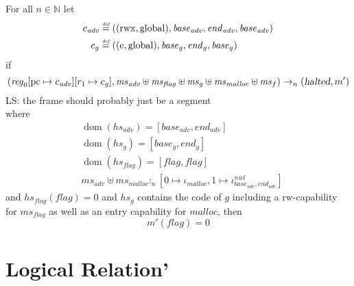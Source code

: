 \documentclass[a4paper]{article}
\newcommand{\forcenewline}{$\phantom{v}$\\}
\newcommand{\update}[2]{[#1 \mapsto #2]}
\newcommand{\defeq}{\stackrel{\textit{\tiny{def}}}{=}}
\DeclareMathOperator{\dom}{dom}
\newcommand\lau[1]{{\color{purple} \sf \footnotesize {LS: #1}}\\}
\newcommand{\var}[1]{\mathit{#1}}
\newcommand{\hs}{\var{ms}}
\newcommand{\ms}{\hs}
\newcommand{\pcreg}{\mathrm{pc}}
\newcommand{\start}{\var{base}}
\newcommand{\addrend}{\var{end}}
\newcommand{\reg}{\var{reg}}
\newcommand{\heap}{\var{mem}}
\newcommand{\adv}{\var{adv}}
\newcommand{\flag}{\var{flag}}
\newcommand{\halted}{\textsl{halted}}
\newcommand{\heapSat}[3][\heap]{#1 :_{#2} #3}
\newcommand{\codelabel}[1]{\mathit{#1}}
\newcommand{\malloc}{\codelabel{malloc}}
\newcommand{\nats}{\mathbb{N}}
\newcommand{\plainperm}[1]{\mathrm{#1}}
\newcommand{\readwrite}{\plainperm{rw}}
\newcommand{\entry}{\plainperm{e}}
\newcommand{\rwx}{\plainperm{rwx}}
\newcommand{\glob}{\plainperm{global}}
\newcommand{\step}[1][]{\rightarrow_{#1}}
\begin{document}
\begin{lemma}\forcenewline
  For all $n \in \nats$
  let
  \begin{align*}
    c_{\var{adv}} & \defeq ((\rwx,\glob),\start_{\adv},\addrend_{\adv},\start_{\adv}) \\
    c_{g} & \defeq ((\entry,\glob),\start_g,\addrend_g,\start_g)
  \end{align*}
  if
  \[
    (\reg_0\update{\pcreg}{c_{\adv}}
    \update{r_1}{c_g},\hs_{\adv} \uplus \hs_{\flag} \uplus \hs_{g} \uplus \hs_{\malloc} \uplus \ms_f) \step[n] (\halted,m')
  \]
  \lau{the frame should probably just be a segment}
  where 
  \begin{align*}
    &\dom(hs_{\adv}) = [\start_\adv,\addrend_\adv] \\
    &\dom(hs_g) = [\start_g,\addrend_g] \\
    &\dom(hs_\flag) = [\flag,\flag] \\
    &\heapSat[\hs_{\adv} \uplus \hs_{\malloc}]{n}{[0 \mapsto \iota_{\malloc}, 1 \mapsto\iota^{\var{nwl}}_{\start_\adv,\addrend_\adv}]}
  \end{align*}
  and $hs_\flag(\flag) = 0$ and $hs_g$ contains the code of $g$ including a $\readwrite$-capability for $\hs_\flag$ as well as an entry capability for $\malloc$, 
  then
  \[
    m'(\flag) = 0
  \]
\end{lemma}


\section{Logical Relation'}
\end{document}
